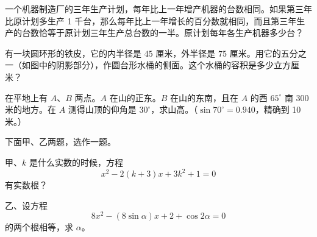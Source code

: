 \begin{question}
一个机器制造厂的三年生产计划，每年比上一年增产机器的台数相同。如果第三年比原计划多生产 1 千台，那么每年比上一年增长的百分数就相同，而且第三年生产的台数恰等于原计划三年生产总台数的一半。原计划每年各生产机器多少台？

\Needspace{0.4\textheight}
\end{question}
\begin{question}
有一块圆环形的铁皮，它的内半径是 $45$ 厘米，外半径是 $75$ 厘米。用它的五分之一（如图中的阴影部分），作圆台形水桶的侧面。这个水桶的容积是多少立方厘米？
\nopagebreak[4]
\begin{center}\end{center}
\nopagebreak[4]
\Needspace{0.4\textheight}
\end{question}
\begin{question}
在平地上有 $A$、$B$ 两点。$A$ 在山的正东。$B$ 在山的东南，且在 $A$ 的西 $65^\circ$ 南 $300$ 米的地方。在 $A$ 测得山顶的仰角是 $30^\circ$，求山高。（$\sin70^\circ=0.940$，精确到 10 米。）
\nopagebreak[4]
\begin{center}\end{center}
\nopagebreak[4]
\end{question}
\begin{question}
下面甲、乙两题，选作一题。

甲、$k$ 是什么实数的时候，方程
\nopagebreak[4]
\[
x^2-2(k+3)x+3k^2+1=0
\]
有实数根？

乙、设方程
\nopagebreak[4]
\[
8x^2-(8\sin\alpha)x+2+\cos2\alpha=0
\]
的两个根相等，求 $\alpha$。

\end{question}